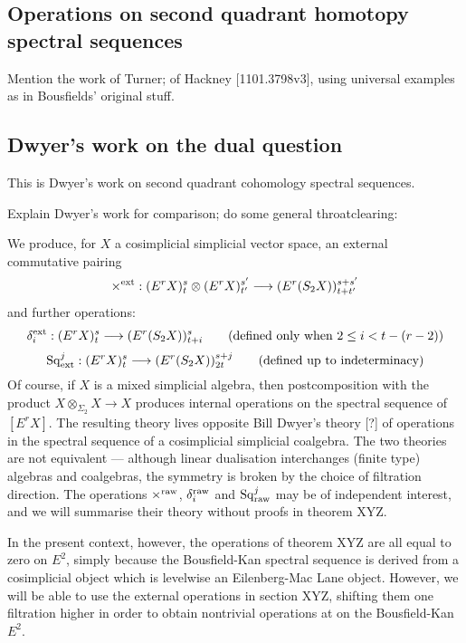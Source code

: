 \documentclass[11pt]{amsart}
\theoremstyle{plain}
\theoremstyle{definition}
\renewcommand{\to}{\longrightarrow}
\theoremstyle{plain}
\newcommand{\Sq}{\mathrm{Sq}}
\begin{document}
\begin{second quadrant homotopy}

\section{\textbf{Operations on second quadrant homotopy spectral sequences}}\label{second quadrant homotopy}


Mention the work of Turner; of Hackney [1101.3798v3], using universal examples as in Bousfields'  original stuff.


\subsection{Dwyer's work on the dual question}
This is Dwyer's work on second quadrant cohomology spectral sequences.

Explain Dwyer's work for comparison; do some general throatclearing: 
\begin{shaded}\tiny
We produce, for $X$ a cosimplicial simplicial vector space, an external commutative pairing
\[\times^\textup{ext}:(E^rX)^s_{t}\otimes (E^rX)_{t'}^{s'}\to (E^r(S_2X))^{s+s'}_{t+t'}\]
and further operations:
\[\delta_i^\textup{ext}:(E^rX)^s_{t}\to (E^r(S_2X))^{s}_{t+i}\textup{\qquad (defined only when $2\leq i<t-(r-2)$)}\]
\[\Sq^j_\textup{ext}:(E^rX)^s_{t}\to (E^r(S_2X))^{s+j}_{2t}\textup{\qquad (defined up to indeterminacy)}\]
Of course, if $X$ is a mixed simplicial algebra, then postcomposition with the product $X\otimes_{\Sigma_2}X\to X$ produces internal operations on the spectral sequence of $[E^rX]$. The resulting theory lives opposite Bill Dwyer's theory [?] of operations in the spectral sequence of a cosimplicial simplicial coalgebra. The two theories are not equivalent --- although linear dualisation interchanges (finite type) algebras and coalgebras, the symmetry is broken by the choice of filtration direction. The operations $\times^\textup{raw}$, $\delta_i^\textup{raw}$ and $\Sq^j_\textup{raw}$ may be of independent interest, and we will summarise their theory without proofs in theorem XYZ.

In the present context, however, the operations of theorem XYZ are all equal to zero on $E^2$, simply because the Bousfield-Kan spectral sequence is derived from a cosimplicial object which is levelwise an Eilenberg-Mac Lane object. However, we will be able to use the external operations in section XYZ, shifting them one filtration higher in order to obtain nontrivial operations at on the Bousfield-Kan $E^2$.



\end{shaded}
\end{second quadrant homotopy}
\end{document}

